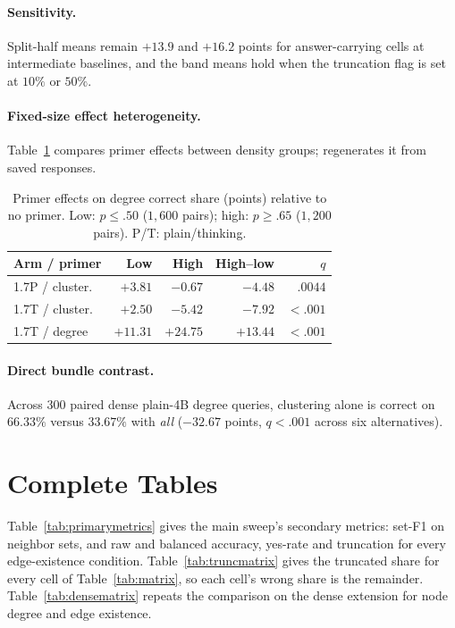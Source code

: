 \documentclass[11pt]{article}
\begin{document}
\paragraph{Sensitivity.} Split-half means remain $+13.9$ and $+16.2$ points for answer-carrying cells at intermediate baselines, %
and the band means hold when the truncation flag is set at $10\%$ or $50\%$. %

\paragraph{Fixed-size effect heterogeneity.} Table~\ref{tab:interactions} compares primer effects between density groups;  regenerates it from saved responses.

\begin{table}[t]
\centering\footnotesize
\setlength{\tabcolsep}{2.4pt}
\begin{tabular}{lrrrr}
\toprule
Arm / primer & Low & High & High--low & $q$\\
\midrule
1.7P / cluster. & $+3.81$ & $-0.67$ & $-4.48$ & $.0044$\\ %
1.7T / cluster. & $+2.50$ & $-5.42$ & $-7.92$ & $<.001$\\ %
1.7T / degree & $+11.31$ & $+24.75$ & $+13.44$ & $<.001$\\ %
\bottomrule
\end{tabular}
\caption{Primer effects on degree correct share (points) relative to no primer. Low: $p\leq .50$ ($1{,}600$ pairs); high: $p\geq .65$ ($1{,}200$ pairs). P/T: plain/thinking. %
}
\label{tab:interactions}
\end{table}

\paragraph{Direct bundle contrast.} Across $300$ paired dense plain-4B degree queries, clustering alone is correct on $66.33\%$ versus $33.67\%$ with \emph{all} ($-32.67$ points, $q<.001$ across six alternatives). %

\section{Complete Tables}
\label{app:tables}
Table~\ref{tab:primarymetrics} gives the main sweep's secondary metrics: set-F1 on neighbor sets, and raw and balanced accuracy, yes-rate and truncation for every edge-existence condition. Table~\ref{tab:truncmatrix} gives the truncated share for every cell of Table~\ref{tab:matrix}, so each cell's wrong share is the remainder. Table~\ref{tab:densematrix} repeats the comparison on the dense extension for node degree and edge existence.




\end{document}
